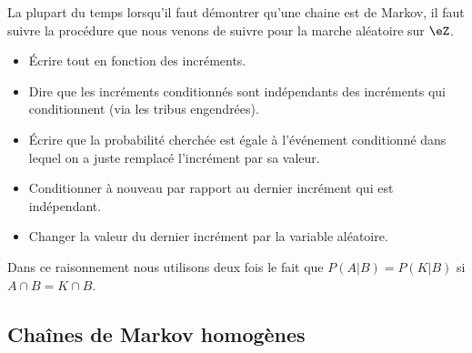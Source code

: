 \begin{remark}
	La plupart du temps lorsqu'il faut démontrer qu'une chaine est de Markov, il faut suivre la procédure que nous venons de suivre pour la marche aléatoire sur \( \eZ\).
	\begin{itemize}
		\item Écrire tout en fonction des incréments.
		\item Dire que les incréments conditionnés sont indépendants des incréments qui conditionnent (via les tribus engendrées).
		\item Écrire que la probabilité cherchée est égale à l'événement conditionné dans lequel on a juste remplacé l'incrément par sa valeur.
		\item Conditionner à nouveau par rapport au dernier incrément qui est indépendant.
		\item Changer la valeur du dernier incrément par la variable aléatoire.
	\end{itemize}
	Dans ce raisonnement nous utilisons deux fois le fait que \( P(A|B)=P(K|B)\) si \( A\cap B=K\cap B\).
\end{remark}

\subsection{Chaînes de Markov homogènes}

